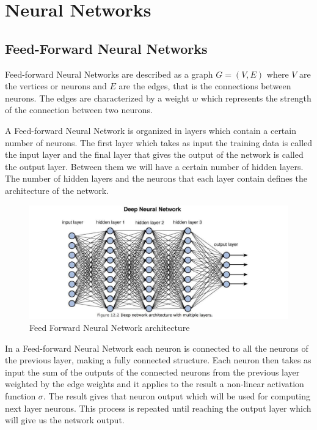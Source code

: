 \chapter{Neural Networks}

\section{Feed-Forward Neural Networks}

Feed-forward Neural Networks are described as a graph $G = (V, E)$ where $V$ are the vertices or neurons and $E$ are the edges, that is the connections between neurons. The edges are characterized by a weight $w$ which represents the strength of the connection between two neurons.

A Feed-forward Neural Network is organized in layers which contain a certain number of neurons. The first layer which takes as input the training data is called the input layer and the final layer that gives the output of the network is called the output layer. Between them we will have a certain number of hidden layers. The number of hidden layers and the neurons that each layer contain defines the architecture of the network.

\begin{figure}[h]
    \centering
    \includegraphics[width=14cm]{Images/feed-forward-nn.jpg}
    \caption{Feed Forward Neural Network architecture}
\end{figure}

\noindent In a Feed-forward Neural Network each neuron is connected to all the neurons of the previous layer, making a fully connected structure. Each neuron then takes as input the sum of the outputs of the connected neurons from the previous layer weighted by the edge weights and it applies to the result a non-linear activation function $\sigma$. The result gives that neuron output which will be used for computing next layer neurons. This process is repeated until reaching the output layer which will give us the network output.

